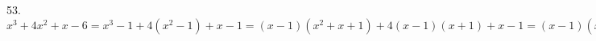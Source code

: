 53. $x^3+4x^2+x-6=x^3-1+4(x^2-1)+x-1=(x-1)(x^2+x+1)+4(x-1)(x+1)+x-1=(x-1)(x^2+x+1+4x+4+1)=(x-1)(x^2+5x+6)=(x-1)(x+2)(x+3).$\\
